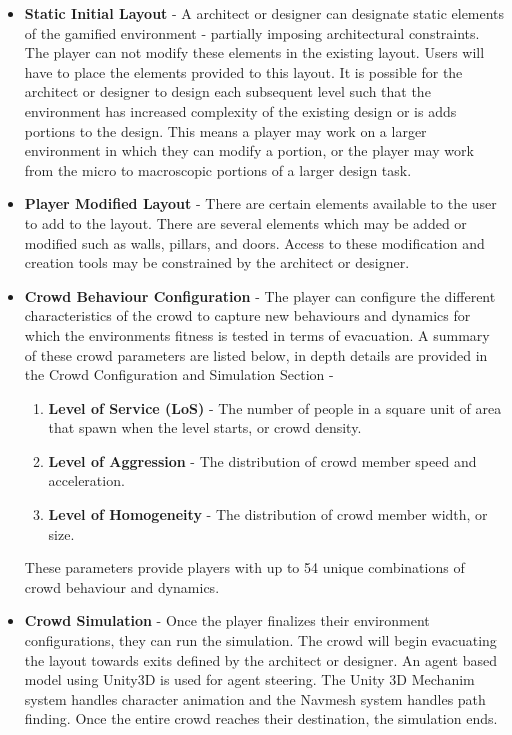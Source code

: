 \begin{itemize} 
\item \textbf{Static Initial Layout} - A architect or designer can designate static elements of the gamified environment - partially imposing architectural constraints. The player can not modify these elements in the existing layout. Users will have to place the elements provided to this layout. It is possible for the architect or designer to design each subsequent level such that the environment has increased complexity of the existing design or is adds portions to the design.  This means a player may work on a larger environment in which they can modify a portion, or the player may work from the micro to macroscopic portions of a larger design task.

\item \textbf{Player Modified Layout} - There are certain elements available to the user to add to the layout. There are several elements which may be added or modified such as walls, pillars, and doors. Access to these modification and creation tools may be constrained by the architect or designer. 

\item \textbf{Crowd Behaviour Configuration} - The player can configure the different 
characteristics of the crowd to capture new behaviours and dynamics for which the environments fitness is tested in terms of evacuation.  A summary of these crowd parameters are listed below, in depth details are provided in the Crowd Configuration and Simulation Section - 

\begin{enumerate}
\item \textbf{Level of Service (LoS)} - The number of people in a square unit of area that spawn when the level starts, or crowd density.

\item \textbf{Level of Aggression} - The distribution of crowd member speed and acceleration.

\item \textbf{Level of Homogeneity} - The distribution of crowd member width, or size.
\end{enumerate}

These parameters provide players with up to 54 unique combinations of crowd behaviour and dynamics.

\item \textbf{Crowd Simulation} - Once the player finalizes their environment configurations, they can run the simulation. The crowd will begin evacuating the layout towards exits defined by the architect or designer. An agent based model using Unity3D is used for agent steering. The Unity 3D Mechanim system handles character animation and the Navmesh system handles path finding. Once the entire crowd reaches their destination, the simulation ends.


\end{itemize}
